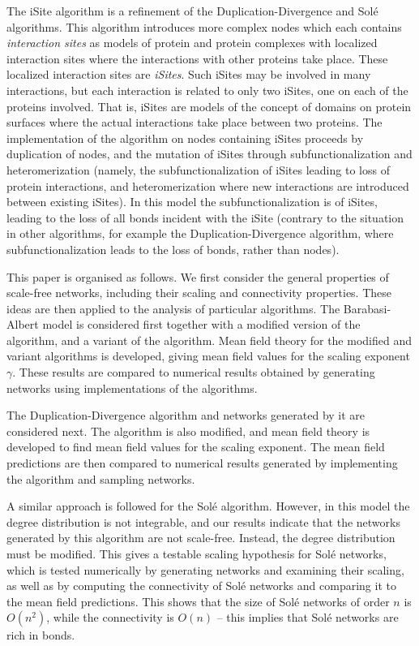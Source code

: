 \documentclass[12pt]{iopart}
\begin{document}
The iSite algorithm \cite{G11,GG15} is a refinement of the Duplication-Divergence and
Sol\'e algorithms.  This algorithm introduces more complex nodes which each contains
\textit{interaction sites} as models of protein and protein complexes with localized 
interaction sites where the interactions with other proteins take place.  These localized
interaction sites are \textit{iSites}.  Such iSites may be involved in many interactions, but
each interaction is related to only two iSites, one on each of the proteins involved.
That is, iSites are models of the concept of domains on protein surfaces where the
actual interactions take place between two proteins.  The implementation of the
algorithm on nodes containing iSites proceeds by duplication of nodes, and the mutation
of iSites through subfunctionalization and heteromerization
(namely, the subfunctionalization of iSites leading to loss of
protein interactions, and heteromerization where new interactions are introduced
between existing iSites).  In this model the subfunctionalization is of iSites, leading to
the loss of all bonds incident with the iSite (contrary to the situation in other algorithms,
for example the Duplication-Divergence algorithm, where subfunctionalization leads
to the loss of bonds, rather than nodes).

This paper is organised as follows.  We first consider the general properties of
scale-free networks, including their scaling and connectivity properties.  These ideas
are then applied to the analysis of particular algorithms.  The Barabasi-Albert
model is considered first together with a modified version of the algorithm, and a
variant of the algorithm.  Mean field theory for the modified and variant
algorithms is developed, giving mean field values for the scaling exponent
$\gamma$.  These results are compared to numerical results obtained by generating
networks using implementations of the algorithms.

The Duplication-Divergence algorithm and networks generated by it are considered
next.  The algorithm is also modified, and mean field theory is developed to
find mean field values for the scaling exponent.  The mean field predictions are
then compared to numerical results generated by implementing the algorithm
and sampling networks.

A similar approach is followed for the Sol\'e algorithm.  However, in this
model the degree distribution is not integrable, and our results indicate that
the networks generated by this algorithm are not scale-free.  Instead, the degree
distribution must be modified.  This gives a testable scaling hypothesis for 
Sol\'e networks, which is tested numerically by generating networks and
examining their scaling, as well as by computing the connectivity of Sol\'e
networks and comparing it to the mean field predictions.  This shows that
the size of Sol\'e networks of order $n$ is $O(n^2)$, while the connectivity
is $O(n)$ -- this implies that Sol\'e networks are rich in bonds.
\end{document}
